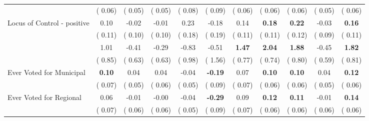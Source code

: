 \begin{tabular}{l c c c c c c c c c c}
& (     0.06) & (     0.05) & (     0.05) & (     0.08) & (     0.09) & (     0.06) & (     0.06) & (     0.06) & (     0.05) & (     0.06) \\
Locus of Control - positive &      0.10 &     -0.02 &     -0.01 &      0.23 &     -0.18 &      0.14 & \textbf{      0.18 } & \textbf{      0.22 } &     -0.03 & \textbf{     0.16} \\
& (     0.11) & (     0.10) & (     0.10) & (     0.18) & (     0.19) & (     0.11) & (     0.11) & (     0.12) & (     0.09) & (     0.11) \\
&      1.01 &     -0.41 &     -0.29 &     -0.83 &     -0.51 & \textbf{      1.47 } & \textbf{      2.04 } & \textbf{      1.88 } &     -0.45 & \textbf{     1.82} \\
& (     0.85) & (     0.63) & (     0.63) & (     0.98) & (     1.56) & (     0.77) & (     0.74) & (     0.80) & (     0.59) & (     0.81) \\
Ever Voted for Municipal & \textbf{      0.10 } &      0.04 &      0.04 &     -0.04 & \textbf{     -0.19 } &      0.07 & \textbf{      0.10 } & \textbf{      0.10 } &      0.04 & \textbf{     0.12} \\
& (     0.07) & (     0.05) & (     0.06) & (     0.05) & (     0.09) & (     0.07) & (     0.06) & (     0.06) & (     0.05) & (     0.06) \\
Ever Voted for Regional &      0.06 &     -0.01 &     -0.00 &     -0.04 & \textbf{     -0.29 } &      0.09 & \textbf{      0.12 } & \textbf{      0.11 } &     -0.01 & \textbf{     0.14} \\
& (     0.07) & (     0.06) & (     0.06) & (     0.05) & (     0.09) & (     0.07) & (     0.06) & (     0.06) & (     0.06) & (     0.06) \\
\bottomrule
\end{tabular}
